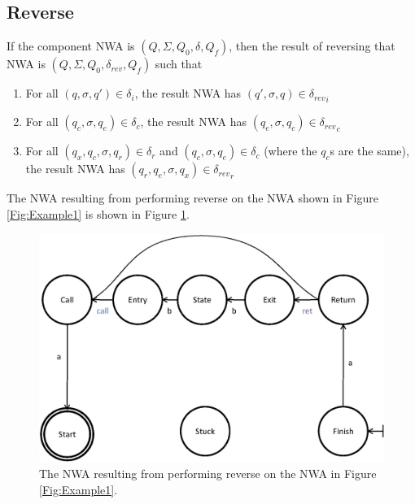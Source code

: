 \documentclass{llncs}
\begin{document}



\subsection{Reverse}
\label{Se:Reverse}

If the component NWA is $(Q, \Sigma, Q_0, \delta, Q_f)$, then the result of reversing that NWA is $(Q, \Sigma, Q_0, \delta_{rev}, Q_f)$ such that

\begin{enumerate}

\item For all $(q,\sigma,q') \in \delta_i$, the result NWA has $(q',\sigma,q) \in {\delta_{rev}}_i$ 

\item For all $(q_c,\sigma,q_e) \in \delta_c$, the result NWA has $(q_e,\sigma,q_c) \in {\delta_{rev}}_c$

\item For all $(q_x,q_c,\sigma,q_r) \in \delta_r$ and $(q_c,\sigma,q_e) \in \delta_c$ (where the $q_c$s are the same), the result NWA has $(q_r,q_e,\sigma,q_x) \in {\delta_{rev}}_r$

\end{enumerate}

\noindent The NWA resulting from performing reverse on the NWA shown in Figure \ref{Fig:Example1} is shown in Figure \ref{Fig:Reverse1}.
 
\begin{figure}[p]
  \centering
    \includegraphics[width=12cm]{Figures/Figure15.eps}
  \caption{The NWA resulting from performing reverse on the NWA in Figure \ref{Fig:Example1}.}
  \label{Fig:Reverse1}
\end{figure}
\end{document}
